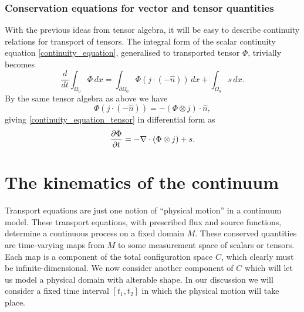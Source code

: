 \subsubsection{Conservation equations for vector and tensor quantities}
With the previous ideas from tensor algebra, it will be easy to describe continuity relations for transport of tensors. The integral form of the scalar continuity equation \eqref{continuity_equation}, generalised to transported tensor $\Phi$, trivially becomes
\begin{equation}\label{continuity_equation_tensor}
    \frac{d}{dt} \int_{\Omega_0} \Phi\,dx = \int_{\partial\Omega_0} \Phi \left(j\cdot (-\hat{n})\right)\,dx + \int_{\Omega_0} s\,dx.
\end{equation}
By the same tensor algebra as above we have
    $$
        \Phi \left(j\cdot (-\hat{n})\right) = -\left(\Phi \otimes j\right) \cdot \hat{n},
    $$
giving \eqref{continuity_equation_tensor} in differential form as
\begin{equation}\label{continuity_equation_tensor_differential}
    \frac{\partial \Phi}{\partial t} = -\nabla\cdot (\Phi \otimes j) + s.
\end{equation}

\section{The kinematics of the continuum}
Transport equations are just one notion of ``physical motion'' in a continuum model.
These transport equations, with prescribed flux and source functions, determine a continuous process on a fixed
domain $M$. These conserved quantities are time-varying maps from $M$ to some measurement space of scalars or tensors.
Each map is a component of the total configuration space $C$, which clearly must be infinite-dimensional.
We now consider another component of $C$
which will let us model a physical domain with alterable shape.
In our discussion we will consider a fixed time interval $[t_1, t_2]$ in which the physical motion will take place.
